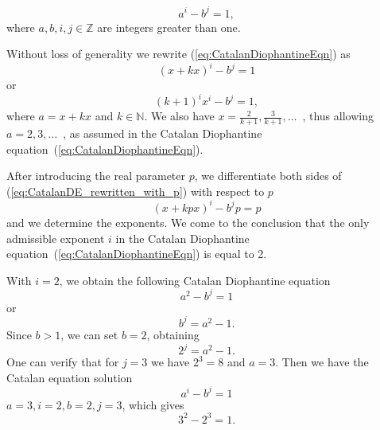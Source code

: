 \documentclass[11pt]{article}
\begin{document}
\begin{equation}
\label{eq:CatalanDiophantineEqn}
a^{i} - b^{j} = 1,
\end{equation}
where $a, b, i, j \in \mathbb{Z}$ are integers greater than one.

Without loss of generality we rewrite (\ref{eq:CatalanDiophantineEqn}) as
\begin{equation}
(x + kx)^{i} - b^{j} = 1
\end{equation}
or
\begin{equation}
\label{eq:CatalanDE_rewritten_x}
(k+1)^{i}x^{i} - b^{j} = 1,
\end{equation}
where $a = x + kx$ and $k \in \mathbb N$.
We also have $x = \frac{2}{k+1}, \frac{3}{k+1}, \ldots$~,
thus allowing $a = 2, 3, \ldots$~, as assumed in the Catalan Diophantine
equation~(\ref{eq:CatalanDiophantineEqn})\@.



After introducing the real parameter $p$,
we differentiate both sides of (\ref{eq:CatalanDE_rewritten_with_p}) with respect to $p$
\begin{equation}
\label{eq:CatalanDE_rewritten_with_p}
(x + kpx)^{i} - b^{j}p = p
\end{equation}
and we determine the exponents.
We come to the conclusion that the only admissible exponent $i$ in the Catalan Diophantine equation~(\ref{eq:CatalanDiophantineEqn})
is equal to 2.



With $i = 2$, we obtain the following Catalan Diophantine equation
\begin{equation}
\label{eq:CatalanDE_with_X_power_2}
a^{2} - b^{j} = 1
\end{equation}
or
\begin{equation}
\label{eq:CatalanDE_with_X_power_2_modified}
b^{j} = a^{2} - 1.
\end{equation}
Since $b > 1$, we can set $b = 2$, obtaining
\begin{equation}
2^{j} = a^{2} - 1.
\end{equation}
One can verify that for $j=3$ we have $2^{3} = 8$ and $a = 3$\@.
Then we have the Catalan equation solution
\begin{equation}
a^{i} - b^{j} = 1
\end{equation}
$a = 3, i = 2, b = 2, j = 3$,
which gives
\begin{equation}
3^{2} - 2^{3} = 1.
\end{equation}

\end{document}
